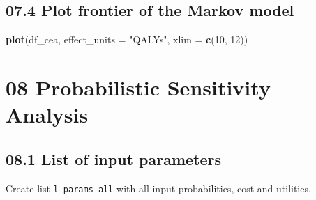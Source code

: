 \documentclass[
]{article}
\newenvironment{Shaded}{\begin{snugshade}}{\end{snugshade}}
\newcommand{\DataTypeTok}[1]{\textcolor[rgb]{0.13,0.29,0.53}{#1}}
\newcommand{\DecValTok}[1]{\textcolor[rgb]{0.00,0.00,0.81}{#1}}
\newcommand{\KeywordTok}[1]{\textcolor[rgb]{0.13,0.29,0.53}{\textbf{#1}}}
\newcommand{\NormalTok}[1]{#1}
\newcommand{\StringTok}[1]{\textcolor[rgb]{0.31,0.60,0.02}{#1}}
\begin{document}
\hypertarget{plot-frontier-of-the-markov-model}{%
\subsection{07.4 Plot frontier of the Markov
model}\label{plot-frontier-of-the-markov-model}}

\begin{Shaded}
\begin{Highlighting}[]
\KeywordTok{plot}\NormalTok{(df_cea, }\DataTypeTok{effect_units =} \StringTok{"QALYs"}\NormalTok{, }\DataTypeTok{xlim =} \KeywordTok{c}\NormalTok{(}\DecValTok{10}\NormalTok{, }\DecValTok{12}\NormalTok{))}
\end{Highlighting}
\end{Shaded}

\hypertarget{probabilistic-sensitivity-analysis}{%
\section{08 Probabilistic Sensitivity
Analysis}\label{probabilistic-sensitivity-analysis}}

\hypertarget{list-of-input-parameters}{%
\subsection{08.1 List of input
parameters}\label{list-of-input-parameters}}

Create list \texttt{l\_params\_all} with all input probabilities, cost
and utilities.
\end{document}
